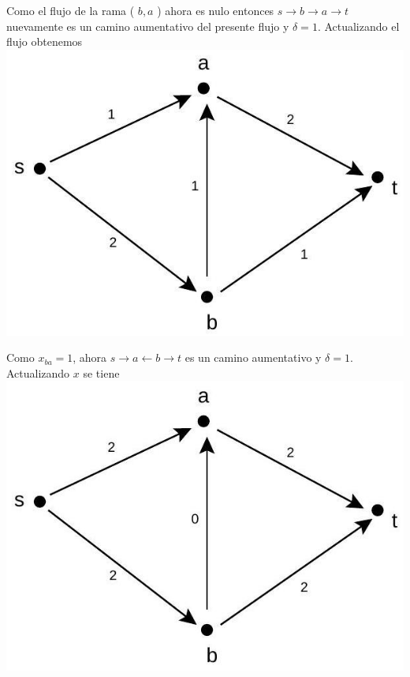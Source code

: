 \documentclass[10pt]{article}
\begin{document}
Como el flujo de la rama ( $b, a$ ) ahora es nulo entonces $s \longrightarrow b \longrightarrow a \longrightarrow t$ nuevamente es un camino aumentativo del presente flujo y $\delta=1$. Actualizando el flujo obtenemos\\
\includegraphics[max width=\textwidth, center]{2025_09_05_aa5f7b8425e7dd302062g-13}

Como $x_{b a}=1$, ahora $s \longrightarrow a \longleftarrow b \longrightarrow t$ es un camino aumentativo y $\delta=1$. Actualizando $x$ se tiene\\
\includegraphics[max width=\textwidth, center]{2025_09_05_aa5f7b8425e7dd302062g-13(3)}
\end{document}
